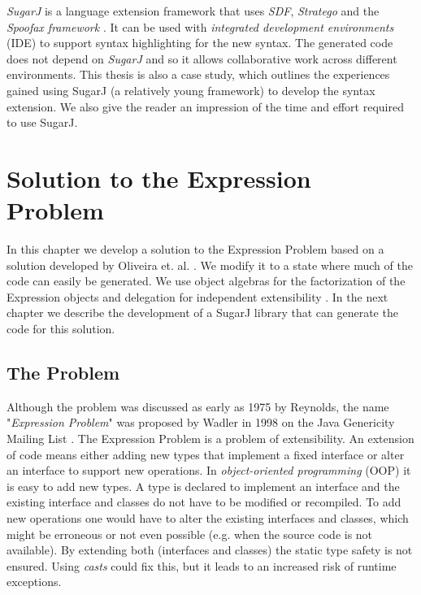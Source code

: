 \documentclass{report}
\begin{document}
\emph{SugarJ} is a language extension framework that uses \emph{SDF}, \emph{Stratego} and the \emph{Spoofax framework} \cite{Kats-Spoofax-2010}. It can be used with \emph{integrated development environments} (IDE) to support syntax highlighting for the new syntax. The generated code does not depend on \emph{SugarJ} and so it allows collaborative work across different environments. This thesis is also a case study, which outlines the experiences gained using SugarJ (a relatively young framework) to develop the syntax extension. We also give the reader an impression of the time and effort required to use SugarJ.


\chapter{Solution to the Expression Problem}
\label{chapterSolutionEP}
In this chapter we develop a solution to the Expression Problem based on a solution developed by Oliveira et. al. \cite{Oliv-Extensibility-2012}. We modify it to a state where much of the code can easily be generated. We use object algebras for the factorization of the Expression objects and delegation for independent extensibility \cite{Tempero-Multiple-2000}. In the next chapter we describe the development of a SugarJ library that can generate the code for this solution.


\section{The Problem}
\label{theProblem}

Although the problem was discussed as early as 1975 by Reynolds, the name "\emph{Expression Problem}" was proposed by Wadler in 1998 on the Java Genericity Mailing List \cite{Reynolds-Abstraction-1975, Wadler-Expression-1998}. The Expression Problem is a problem of extensibility. An extension of code means either adding new types that implement a fixed interface or alter an interface to support new operations. In \emph{object-oriented programming} (OOP) it is easy to add new types. A type is declared to implement an interface and the existing interface and classes do not have to be modified or recompiled. To add new operations one would have to alter the existing interfaces and classes, which might be erroneous or not even possible (e.g. when the source code is not available). By extending both (interfaces and classes) the static type safety is not ensured. Using \emph{casts} could fix this, but it leads to an increased risk of runtime exceptions.
\end{document}

